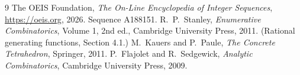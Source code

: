 \documentclass[11pt,a4paper]{article}
\theoremstyle{plain}
\theoremstyle{definition}
\begin{document}
\begin{thebibliography}{9}
 The OEIS Foundation, \emph{The On-Line Encyclopedia of Integer
Sequences}, \url{https://oeis.org}, 2026. Sequence A188151.
 R.~P.~Stanley, \emph{Enumerative Combinatorics}, Volume 1, 2nd ed.,
Cambridge University Press, 2011. (Rational generating functions, Section 4.1.)
 M.~Kauers and P.~Paule, \emph{The Concrete Tetrahedron}, Springer, 2011.
 P.~Flajolet and R.~Sedgewick, \emph{Analytic Combinatorics}, Cambridge
University Press, 2009.
\end{thebibliography}
\end{document}
